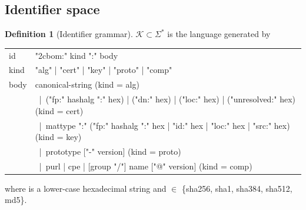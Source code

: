 \documentclass[11pt,a4paper]{article}
\newcommand{\Ids}{\mathcal{K}}
\theoremstyle{definition}
\newtheorem{definition}{Definition}[section]
\theoremstyle{plain}
\begin{document}
\subsection{Identifier space}
\begin{definition}[Identifier grammar]
$\Ids \subset \Sigma^{*}$ is the language generated by
\begin{center}\ttfamily\small
\begin{tabular}{l@{\ ::=\ }p{12.2cm}}
id        & "2cbom:" kind ":" body \\
kind      & "alg" | "cert" | "key" | "proto" | "comp" \\
body      & canonical-string \quad(kind = alg)\\
          & \ |\ ("fp:" hashalg ":" hex) | ("dn:" hex) | ("loc:" hex) | ("unresolved:" hex) \quad(kind = cert)\\
          & \ |\ mattype ":" ("fp:" hashalg ":" hex | "id:" hex | "loc:" hex | "src:" hex) \quad(kind = key)\\
          & \ |\ prototype ["-" version] \quad(kind = proto)\\
          & \ |\ purl | cpe | [group "/"] name ["@" version] \quad(kind = comp)
\end{tabular}
\end{center}
where  is a lower-case hexadecimal string and  $\in$ \{sha256, sha1, sha384, sha512, md5\}.
\end{definition}
\end{document}

